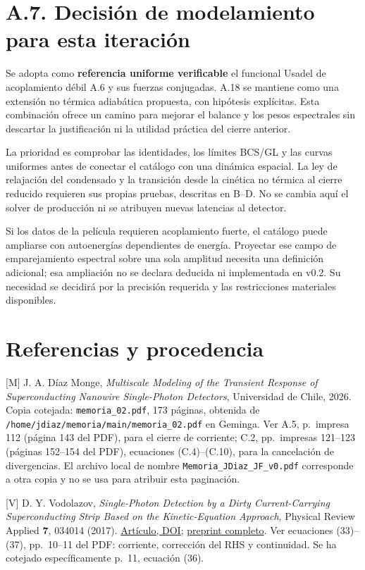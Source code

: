 \documentclass[
  spanish,
  10pt,
  a4paper,
]{article}
\begin{document}
\section{A.7. Decisión de modelamiento para esta
iteración}\label{a.7.-decisiuxf3n-de-modelamiento-para-esta-iteraciuxf3n}

Se adopta como \textbf{referencia uniforme verificable} el funcional
Usadel de acoplamiento débil A.6 y sus fuerzas conjugadas. A.18 se
mantiene como una extensión no térmica adiabática propuesta, con
hipótesis explícitas. Esta combinación ofrece un camino para mejorar el
balance y los pesos espectrales sin descartar la justificación ni la
utilidad práctica del cierre anterior.

La prioridad es comprobar las identidades, los límites BCS/GL y las
curvas uniformes antes de conectar el catálogo con una dinámica
espacial. La ley de relajación del condensado y la transición desde la
cinética no térmica al cierre reducido requieren sus propias pruebas,
descritas en B--D. No se cambia aquí el solver de producción ni se
atribuyen nuevas latencias al detector.

Si los datos de la película requieren acoplamiento fuerte, el catálogo
puede ampliarse con autoenergías dependientes de energía. Proyectar ese
campo de emparejamiento espectral sobre una sola amplitud necesita una
definición adicional; esa ampliación no se declara deducida ni
implementada en v0.2. Su necesidad se decidirá por la precisión
requerida y las restricciones materiales disponibles.

\section{Referencias y procedencia}\label{referencias-y-procedencia}

{[}M{]} J. A. Díaz Monge, \emph{Multiscale Modeling of the Transient
Response of Superconducting Nanowire Single-Photon Detectors},
Universidad de Chile, 2026. Copia cotejada: \nolinkurl{memoria_02.pdf},
173 páginas, obtenida de
\nolinkurl{/home/jdiaz/memoria/main/memoria_02.pdf} en Geminga. Ver A.5,
p.~impresa 112 (página 143 del PDF), para el cierre de corriente; C.2,
pp.~impresas 121--123 (páginas 152--154 del PDF), ecuaciones
(C.4)--(C.10), para la cancelación de divergencias. El archivo local de
nombre \nolinkurl{Memoria_JDiaz_JF_v0.pdf} corresponde a otra copia y no
se usa para atribuir esta paginación.

{[}V{]} D. Y. Vodolazov, \emph{Single-Photon Detection by a Dirty
Current-Carrying Superconducting Strip Based on the Kinetic-Equation
Approach}, Physical Review Applied \textbf{7}, 034014 (2017).
\href{https://doi.org/10.1103/PhysRevApplied.7.034014}{Artículo, DOI};
\href{https://arxiv.org/pdf/1611.06060}{preprint completo}. Ver
ecuaciones (33)--(37), pp.~10--11 del PDF: corriente, corrección del RHS
y continuidad. Se ha cotejado específicamente p.~11, ecuación (36).
\end{document}

